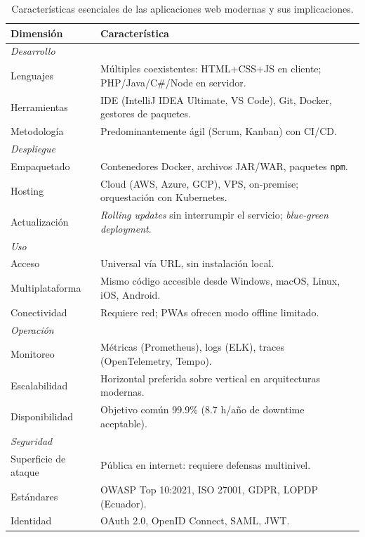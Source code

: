 \documentclass[11pt,a4paper,openany]{book}
\begin{document}
\begin{table}[htbp]
\centering
\caption{Características esenciales de las aplicaciones web modernas y sus implicaciones.}
\label{tab:caracteristicas-web}
\footnotesize
\begin{tabularx}{\textwidth}{lX}
\toprule
\textbf{Dimensión} & \textbf{Característica}\\
\midrule
\multicolumn{2}{l}{\emph{Desarrollo}}\\
Lenguajes & Múltiples coexistentes: HTML+CSS+JS en cliente; PHP/Java/C\#/Node en servidor.\\
Herramientas & IDE (IntelliJ IDEA Ultimate, VS Code), Git, Docker, gestores de paquetes.\\
Metodología & Predominantemente ágil (Scrum, Kanban) con CI/CD.\\
\midrule
\multicolumn{2}{l}{\emph{Despliegue}}\\
Empaquetado & Contenedores Docker, archivos JAR/WAR, paquetes \texttt{npm}.\\
Hosting & Cloud (AWS, Azure, GCP), VPS, on-premise; orquestación con Kubernetes.\\
Actualización & \emph{Rolling updates} sin interrumpir el servicio; \emph{blue-green deployment}.\\
\midrule
\multicolumn{2}{l}{\emph{Uso}}\\
Acceso & Universal vía URL, sin instalación local.\\
Multiplataforma & Mismo código accesible desde Windows, macOS, Linux, iOS, Android.\\
Conectividad & Requiere red; PWAs ofrecen modo offline limitado.\\
\midrule
\multicolumn{2}{l}{\emph{Operación}}\\
Monitoreo & Métricas (Prometheus), logs (ELK), traces (OpenTelemetry, Tempo).\\
Escalabilidad & Horizontal preferida sobre vertical en arquitecturas modernas.\\
Disponibilidad & Objetivo común 99.9\% (8.7 h/año de downtime aceptable).\\
\midrule
\multicolumn{2}{l}{\emph{Seguridad}}\\
Superficie de ataque & Pública en internet: requiere defensas multinivel.\\
Estándares & OWASP Top 10:2021, ISO 27001, GDPR, LOPDP (Ecuador).\\
Identidad & OAuth 2.0, OpenID Connect, SAML, JWT.\\
\bottomrule
\end{tabularx}
\end{table}
\end{document}
